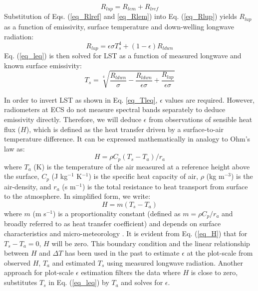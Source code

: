 \documentclass[fleqn,10pt]{wlscirep}
\begin{document}
\begin{equation}\label{eq_Rlup}
R_{lup} = R_{lem} + R_{lref}
\end{equation}
Substitution of Eqs. (\ref{eq_Rlref} and \ref{eq_Rlem}) into Eq. (\ref{eq_Rlup}) yields $R_{lup}$ as a function of emissivity, surface temperature and down-welling longwave radiation:
\begin{equation}\label{eq_leq}
R_{lup}= \epsilon \sigma T_{s}^{4} + (1- \epsilon)R_{ldwn}
\end{equation}
Eq. (\ref{eq_leq}) is then solved for LST as a function of measured longwave and known surface emissivity:
\begin{equation}\label{eq_Tleq}
T_{s} = \sqrt[4]{\frac{R_{ldwn}}{\sigma} - \frac{R_{ldwn}}{\epsilon \sigma} + \frac{R_{lup}}{\epsilon \sigma}}
\end{equation}

In order to invert LST as shown in Eq. \eqref{eq_Tleq}, $\epsilon$ values are required. However, radiometers at ECS do not measure spectral bands separately to deduce emissivity directly. Therefore, we will deduce $\epsilon$ from observations of sensible heat flux ($H$), which is defined as the heat transfer driven by a surface-to-air temperature difference. It can be expressed mathematically in analogy to Ohm's law as:
\begin{equation}\label{eq_H1}
H= \rho C_{p}(T_{s} - T_{a})/r_{a}
\end{equation}
where $T_{a}$ (K) is the temperature of the air measured at a reference height above the surface, $C_{p}$ (J kg$^{-1}$ K$^{-1}$) is the specific heat capacity of air, $\rho$ (kg m$^{-3}$) is the air-density, and $r_{a}$ (s m$^{-1}$) is the total resistance to heat transport from surface to the atmosphere. In simplified form, we write:
\begin{equation}\label{eq_H}
H= m(T_{s} - T_{a})
\end{equation}
where $m$ (m s$^{-1}$) is a proportionality constant (defined as $m=\rho C_{p}/r_{a}$ and broadly referred to as heat transfer coefficient) and depends on surface characteristics and micro-meteorology \cite{lhomme1988radiative}. It is evident from Eq. (\ref{eq_H}) that for $T_{s} - T_{a} = 0$, $H$ will be zero. This boundary condition and the linear relationship  between $H$ and $\Delta T $ has been used in the past to estimate $\epsilon$ at the plot-scale from observed $H$, $T_a$ and estimated $T_{s}$ using measured longwave radiation\cite{holmes2009land,holmes2016cloud}. Another approach for plot-scale $\epsilon$ estimation filters the data where $H$ is close to zero, substitutes $T_{s}$ in Eq. (\ref{eq_leq}) by $T_{a}$ and solves for $\epsilon$\cite{maes2019potential}. 
\end{document}
